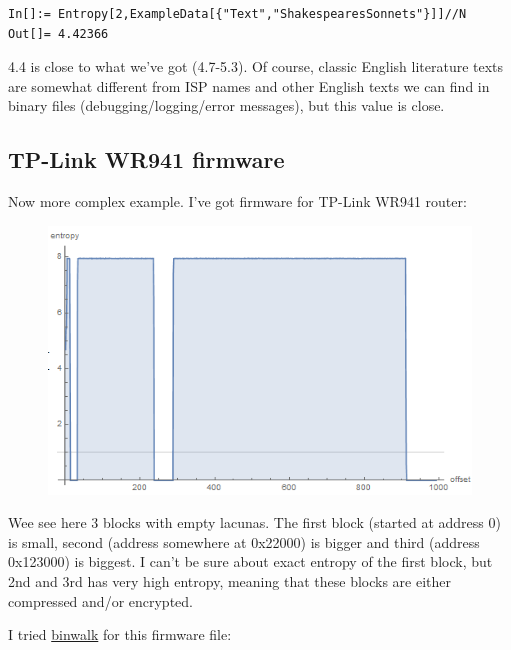 \begin{lstlisting}
In[]:= Entropy[2,ExampleData[{"Text","ShakespearesSonnets"}]]//N
Out[]= 4.42366
\end{lstlisting}

4.4 is close to what we've got (4.7-5.3). 
Of course, classic English literature texts are somewhat different from ISP names and other English texts we can find in binary files 
(debugging/logging/error messages), but this value is close.

\subsection{TP-Link WR941 firmware}

Now more complex example. I've got firmware for TP-Link WR941 router:

\begin{figure}[H]
\centering
\includegraphics[scale=\FigScale]{ff/entropy/tplink.png}
\end{figure}

Wee see here 3 blocks with empty lacunas.
The first block (started at address 0) is small, second (address somewhere at 0x22000) is bigger and third (address 0x123000) is biggest.
I can't be sure about exact entropy of the first block, but 2nd and 3rd has very high entropy, meaning that these blocks are either
compressed and/or encrypted.

I tried \href{http://binwalk.org/}{binwalk} for this firmware file:

